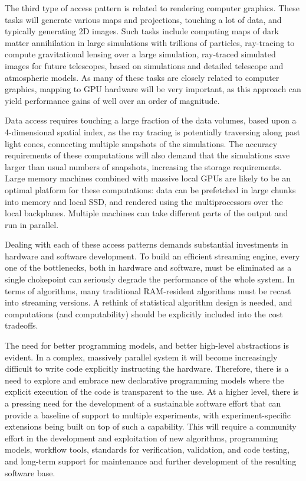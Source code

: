 The third type of access pattern is related to rendering computer
graphics. These tasks will generate various maps and projections,
touching a lot of data, and typically generating 2D images. Such tasks
include computing maps of dark matter annihilation in large
simulations with trillions of particles, ray-tracing to compute
gravitational lensing over a large simulation, ray-traced simulated
images for future telescopes, based on simulations and detailed
telescope and atmospheric models. As many of these tasks are closely
related to computer graphics, mapping to GPU hardware will be very
important, as this approach can yield performance gains of well over
an order of magnitude.

Data access requires touching a large fraction of the data volumes,
based upon a 4-dimensional spatial index, as the ray tracing is
potentially traversing along past light cones, connecting multiple
snapshots of the simulations. The accuracy requirements of these
computations will also demand that the simulations save larger than
usual numbers of snapshots, increasing the storage requirements. Large
memory machines combined with massive local GPUs are likely to be an
optimal platform for these computations: data can be prefetched in
large chunks into memory and local SSD, and rendered using the
multiprocessors over the local backplanes. Multiple machines can take
different parts of the output and run in parallel.

Dealing with each of these access patterns demands substantial
investments in hardware and software development. To build an
efficient streaming engine, every one of the bottlenecks, both in
hardware and software, must be eliminated as a single chokepoint can
seriously degrade the performance of the whole system. In terms of
algorithms, many traditional RAM-resident algorithms must be recast
into streaming versions. A rethink of statistical algorithm design is
needed, and computations (and computability) should be explicitly
included into the cost tradeoffs.

The need for better programming models, and better high-level
abstractions is evident. In a complex, massively parallel system it
will become increasingly difficult to write code explicitly
instructing the hardware. Therefore, there is a need to explore and
embrace new declarative programming models where the explicit
execution of the code is transparent to the use. At a higher level,
there is a pressing need for the development of a sustainable software
effort that can provide a baseline of support to multiple experiments,
with experiment-specific extensions being built on top of such a
capability. This will require a community effort in the development
and exploitation of new algorithms, programming models, workflow
tools, standards for verification, validation, and code testing, and
long-term support for maintenance and further development of the
resulting software base.

